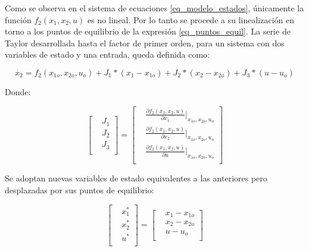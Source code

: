 Como se observa en el sistema de ecuaciones \ref{eq_modelo_estados}, únicamente la función $f_2(x_1,x_2,u)$ es no lineal. Por lo tanto se procede a su linealización en torno a los puntos de equilibrio de la expresión \ref{eq_puntos_equil}. La serie de Taylor desarrollada hasta el factor de primer orden, para un sistema con dos variables de estado y una entrada, queda definida como:

\begin{equation} \label{eq_taylor}
	\dot{x_{2}}=f_2(x_{1o}, x_{2o}, u_{o})+J_1*(x_1-x_{1o})+J_2*(x_2-x_{2o})+J_3*(u-u_o)
\end{equation}

Donde:

\begin{equation} \label{eq_jacobianos}
	\begin{bmatrix} %
		&{J_{1}}\\
		&{J_{2}}\\
		&{J_{3}}\\
	\end{bmatrix}
	=
	\begin{bmatrix} %
		&\frac{\partial{f_2(x_1,x_2,u)}}{\partial{x_1}}\Biggr|_{x_{1o},x_{2o},u_o}\\
		&\frac{\partial{f_2(x_1,x_2,u)}}{\partial{x_2}}\Biggr|_{x_{1o},x_{2o},u_o}\\
		&\frac{\partial{f_2(x_1,x_2,u)}}{\partial{u}}\Biggr|_{x_{1o},x_{2o},u_o}\\
	\end{bmatrix}
\end{equation}

Se adoptan nuevas variables de estado equivalentes a las anteriores pero desplazadas por sus puntos de equilibrio:

 \begin{equation*}
 	\begin{bmatrix}
 		&x_1^*\\
 		&x_2^*\\
 		&u^*\\
 	\end{bmatrix}
 	=
 	\begin{bmatrix}
 		&x_1-x_{1o}\\
 		&x_2-x_{2o}\\
 		&u-u_o\\
 	\end{bmatrix}
 \end{equation*}



